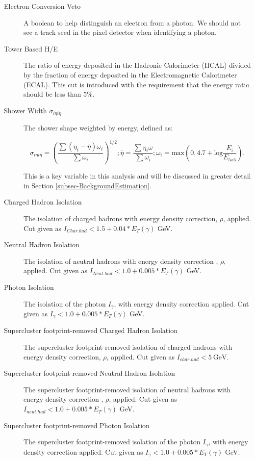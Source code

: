 \begin{description}

\item[Electron Conversion Veto] A boolean to help distinguish an electron from a photon. We should not see a track seed in the pixel detector when identifying a photon. 

\item[Tower Based H/E] The ratio of energy deposited in the Hadronic Calorimeter (HCAL) divided by the fraction of energy deposited in the Electromagnetic Calorimeter (ECAL). This cut is introduced with the requirement that the energy ratio should be less than 5\%.

\item[Shower Width $\sigma_{i\eta i\eta}$] The shower shape weighted by energy, defined as: 

\begin{equation}
\sigma_{i\eta i\eta} = \left(\frac{\sum(\eta_i - \bar{\eta})\omega_i}{\sum\omega_i}\right)^{1/2};  \bar{\eta} = \frac{\sum\eta_i\omega}{\sum\omega_i};  \omega_i = \text{max}\left(0, 4.7 +
\text{log}\frac{E_i}{E_{5x5}}\right).
\end{equation}

This is a key variable in this analysis and will be discussed in greater detail in Section \ref{subsec-BackgroundEstimation}.

\item[Charged Hadron Isolation] The isolation of charged hadrons with energy density correction, $\rho$, applied. Cut given as $I_{Char.had} < 1.5 + 0.04*E_T(\gamma)$ GeV. 

\item[Neutral Hadron Isolation] The isolation of neutral hadrons with energy density correction , $\rho$, applied. Cut given as $I_{Neut.had} < 1.0 + 0.005*E_T(\gamma)$ GeV. 

\item[Photon Isolation] The isolation of the photon $I_{\gamma}$, with energy density correction applied. Cut given as $I_{\gamma} < 1.0 + 0.005*E_T(\gamma)$ GeV.


\item[Supercluster footprint-removed Charged Hadron Isolation] The supercluster footprint-removed isolation of charged hadrons with energy density correction, $\rho$, applied.
Cut given as $I_{char.had} < 5 \ \text{GeV} $. 

\item[Supercluster footprint-removed Neutral Hadron Isolation] The supercluster footprint-removed isolation of neutral hadrons with energy density correction , $\rho$, applied.
Cut given as $I_{neut.had} < 1.0 + 0.005*E_T(\gamma)$ GeV. 

\item[Supercluster footprint-removed Photon Isolation] The supercluster footprint-removed isolation of the photon $I_{\gamma}$, with energy density correction applied. Cut given
as $I_{\gamma} < 1.0 + 0.005*E_T(\gamma)$ GeV. 

\end{description}

